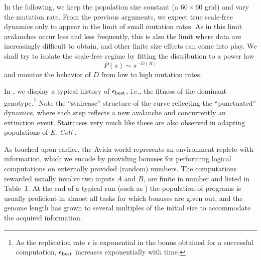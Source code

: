 \documentclass[letterpaper]{article}
\begin{document}
In the following, we keep the population size constant (a $60\times60$
grid) and vary the mutation rate. From the previous arguments, we
expect true scale-free dynamics only to appear in the limit of small
mutation rates.  As in this limit avalanches occur less and less
frequently, this is also the limit where data are increasingly
difficult to obtain, and other finite size effects can come into play.
We shall try to isolate the scale-free regime by fitting the
distribution to a power law
\begin{equation}
    P(s)\sim s^{-D(R)}\label{power}
\end{equation}
and monitor the behavior of $D$ from low to high mutation rates.

In , we display a typical history of $\epsilon_{\rm
best}$, i.e., the fitness of the dominant genotype.\footnote{As the
replication rate $\epsilon$ is exponential in the bonus obtained for a
successful computation, $\epsilon_{\rm best}$ increases exponentially
with time.}  Note the ``staircase'' structure of the curve reflecting
the ``punctuated'' dynamics, where each step reflects a new avalanche
and concurrently an extinction event. Staircases very much like these
are also observed in adapting populations of {\it E. Coli}
\citep{LT94}.

As touched upon earlier, the Avida world represents an environment
replete with information, which we encode by providing bonuses for
performing logical computations on externally provided (random)
numbers. The computations rewarded usually involve two inputs $A$ and
$B$, are finite in number and listed in Table~1. At the end of a
typical run (such as ) the population of programs is
usually proficient in almost all tasks for which bonuses are given
out, and the genome length has grown to several multiples of the
initial size to accommodate the acquired information.
\end{document}
